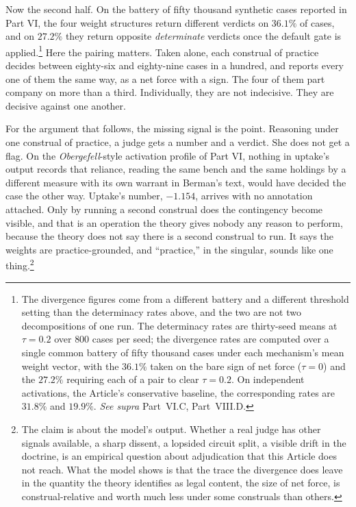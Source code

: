 Now the second half. On the battery of fifty thousand synthetic cases
reported in Part VI, the four weight structures return different verdicts
on $36.1\%$ of cases, and on $27.2\%$ they return opposite
\textit{determinate} verdicts once the default gate is
applied.\footnote{The divergence figures come from a different battery
and a different threshold setting than the determinacy rates above, and
the two are not two decompositions of one run. The determinacy rates are
thirty-seed means at $\tau = 0.2$ over $800$ cases per seed; the
divergence rates are computed over a single common battery of fifty
thousand cases under each mechanism's mean weight vector, with the
$36.1\%$ taken on the bare sign of net force ($\tau = 0$) and the
$27.2\%$ requiring each of a pair to clear $\tau = 0.2$. On independent
activations, the Article's conservative baseline, the corresponding rates
are $31.8\%$ and $19.9\%$. \textit{See supra} Part~VI.C, Part~VIII.D.}
Here the pairing matters. Taken alone, each construal of practice decides between eighty-six and
eighty-nine cases in a hundred, and reports every one of them the same way,
as a net force with a sign. The four of them part
company on more than a third. Individually, they are not indecisive. They
are decisive against one another.

For the argument that follows, the missing signal is the point. Reasoning under one construal of practice, a judge gets a number and a
verdict. She does not get a flag. On the
\textit{Obergefell}-style activation profile of Part VI, nothing in uptake's
output records that reliance, reading the same bench and the same holdings by
a different measure with its own warrant in Berman's text, would have decided
the case the other way. Uptake's number, $-1.154$, arrives with no annotation attached. Only by
running a second construal does the contingency become visible, and that is
an operation the theory gives nobody any reason to perform, because the
theory does not say there is a second construal to run. It says the weights are practice-grounded, and
``practice,'' in the singular, sounds like one thing.\footnote{The claim
is about the model's output. Whether a real judge has other signals
available, a sharp dissent, a lopsided circuit split, a visible drift in
the doctrine, is an empirical question about adjudication that this
Article does not reach. What the model shows is that the trace the divergence does leave in the
quantity the theory identifies as legal content, the size of net force, is
construal-relative and worth much less under some construals than others.}

